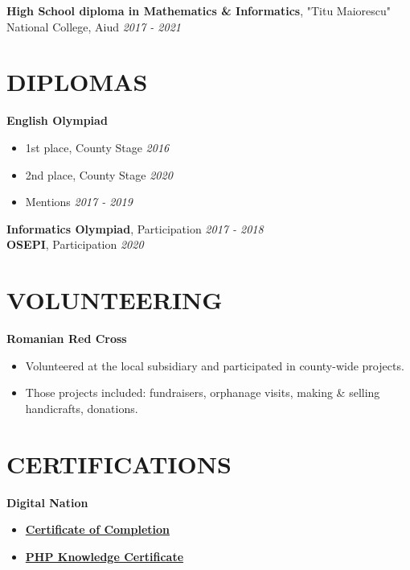\documentclass[margin]{res}
\begin{document}
\begin{resume}
  \vspace{-6mm}
  {\bf High School diploma in Mathematics \& Informatics}, "Titu Maiorescu" National College, Aiud \hfill \textit{2017 - 2021}\\

  \section{DIPLOMAS}
  {\bf English Olympiad}
  \begin{itemize}\itemsep -6pt
    \item 1st place, County Stage \hfill \textit{2016}\\
    \item 2nd place, County Stage \hfill \textit{2020}\\
    \item Mentions \hfill \textit{2017 - 2019}\\
  \end{itemize}
  {\bf Informatics Olympiad}, Participation \hfill \textit{2017 - 2018}\\
  {\bf OSEPI}, Participation \hfill \textit{2020}\\

  \section{VOLUNTEERING}
  \hspace{4mm}
  {\bf Romanian Red Cross}
  \begin{itemize}
    \item Volunteered at the local subsidiary and participated in county-wide projects.
    \item Those projects included: fundraisers, orphanage visits, making \& selling handicrafts, donations.
  \end{itemize}

  \section{CERTIFICATIONS}
  \hspace{4mm}
  {\bf Digital Nation}
  \begin{itemize}
    \item \href{https://drive.google.com/file/d/15JN-Ko_CXP_WKGsrRxdQNzniaNkSrgTx/view}{\textbf{Certificate of Completion}}
    \item \href{https://drive.google.com/file/d/1Ahga9TNBsfRH_j3DBIsywD5D3XRbzElf/view}{\textbf{PHP Knowledge Certificate}}
  \end{itemize}
\end{resume}
\end{document}
